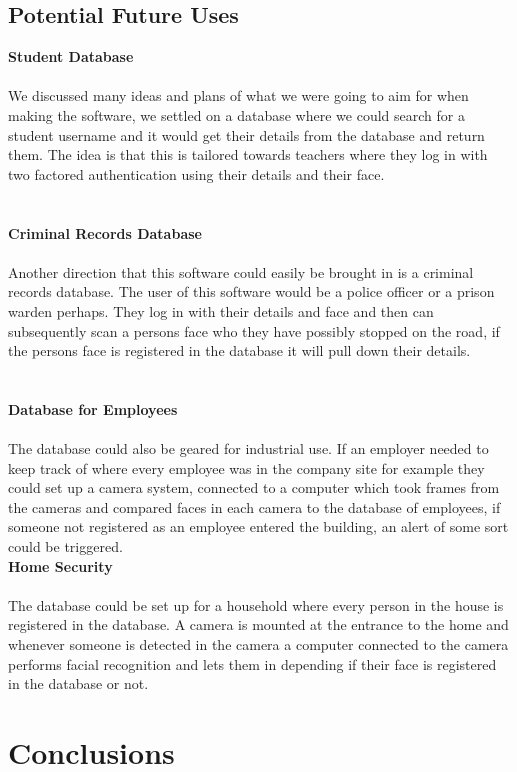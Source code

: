 \documentclass{article}
\begin{document}
\subsection{Potential Future Uses}
\textbf{Student Database}\\\\
We discussed many ideas and plans of what we were going to aim for when making the software, we settled on a database where we could search for a student username and it would get their details from the database and return them. The idea is that this is tailored towards teachers where they log in with two factored authentication using their details and their face.
\\\\\\
\textbf{Criminal Records Database}\\\\
Another direction that this software could easily be brought in is a criminal records database. The user of this software would be a police officer or a prison warden perhaps. They log in with their details and face and then can subsequently scan a persons face who they have possibly stopped on the road, if the persons face is registered in the database it will pull down their details.
\\\\\\
\textbf{Database for Employees}\\\\
The database could also be geared for industrial use. If an employer needed to keep track of where every employee was in the company site for example they could set up a camera system, connected to a computer which took frames from the cameras and compared faces in each camera to the database of employees, if someone not registered as an employee entered the building, an alert of some sort could be triggered.
\\\textbf{Home Security}\\\\
The database could be set up for a household where every person in the house is registered in the database. A camera is mounted at the entrance to the home and whenever someone is detected in the camera a computer connected to the camera performs facial recognition and lets them in depending if their face is registered in the database or not.

\newpage

\section{Conclusions}


\newpage
\printbibliography
\end{document}
